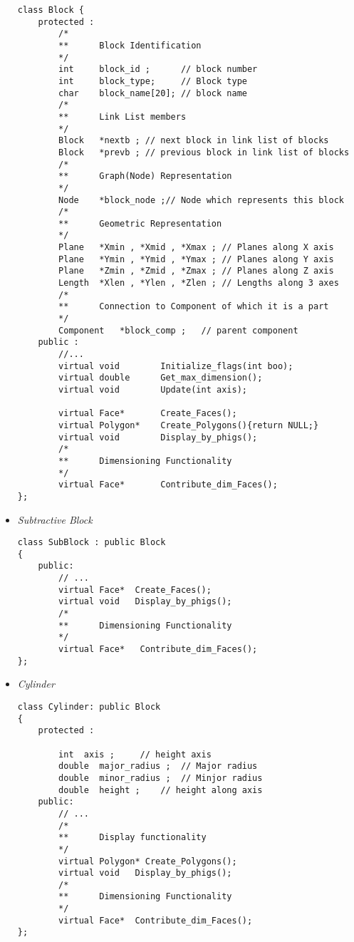 \begin{itemize}
            \begin{verbatim}
class Block {
    protected :
        /*
        **      Block Identification
        */
        int     block_id ;      // block number
        int     block_type;     // Block type
        char    block_name[20]; // block name
        /*
        **      Link List members
        */
        Block   *nextb ; // next block in link list of blocks
        Block   *prevb ; // previous block in link list of blocks
        /*
        **      Graph(Node) Representation
        */
        Node    *block_node ;// Node which represents this block
        /*
        **      Geometric Representation
        */
        Plane   *Xmin , *Xmid , *Xmax ; // Planes along X axis
        Plane   *Ymin , *Ymid , *Ymax ; // Planes along Y axis
        Plane   *Zmin , *Zmid , *Zmax ; // Planes along Z axis
        Length  *Xlen , *Ylen , *Zlen ; // Lengths along 3 axes
        /*
        **      Connection to Component of which it is a part
        */
        Component   *block_comp ;   // parent component
    public :
        //...
        virtual void        Initialize_flags(int boo);
        virtual double      Get_max_dimension();
        virtual void        Update(int axis);

        virtual Face*       Create_Faces();
        virtual Polygon*    Create_Polygons(){return NULL;}
        virtual void        Display_by_phigs();
        /*
        **      Dimensioning Functionality
        */
        virtual Face*       Contribute_dim_Faces();
};
		\end{verbatim}


	\item
	{\em Subtractive Block} \label{appsblk}

            \begin{verbatim}
class SubBlock : public Block
{
    public:
        // ...
        virtual Face*  Create_Faces();
        virtual void   Display_by_phigs();
        /*
        **      Dimensioning Functionality
        */
        virtual Face*   Contribute_dim_Faces();
};
            \end{verbatim}

	\item
	\label{appcyl}
	{\em Cylinder}

            \begin{verbatim}
class Cylinder: public Block
{
    protected :

        int  axis ;     // height axis
        double  major_radius ;  // Major radius
        double  minor_radius ;  // Minjor radius
        double  height ;    // height along axis
    public:
        // ...
        /*
        **      Display functionality
        */
        virtual Polygon* Create_Polygons();
        virtual void   Display_by_phigs();
        /*
        **      Dimensioning Functionality
        */
        virtual Face*  Contribute_dim_Faces();
};
            \end{verbatim}


\end{itemize}
